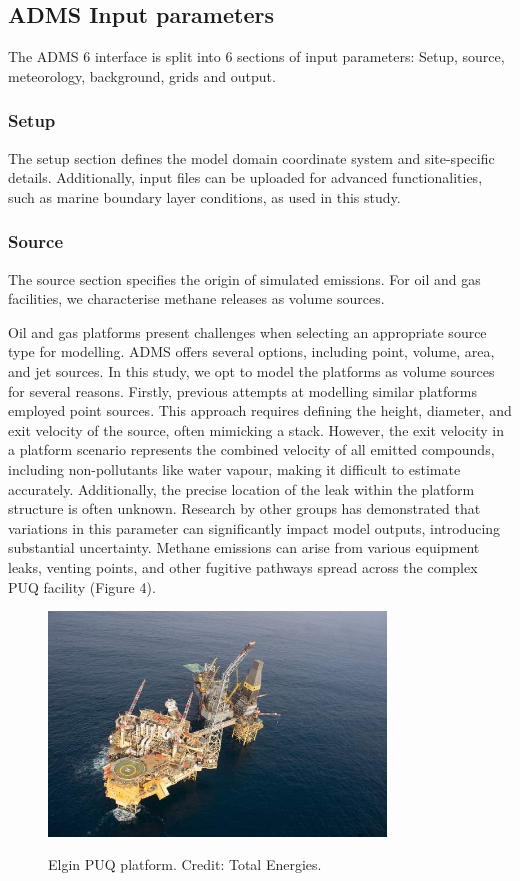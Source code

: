 \documentclass[12pt]{article}
\begin{document}
\subsection{ ADMS Input parameters}
The ADMS 6 interface is split into 6 sections of input parameters: Setup, source, meteorology, background, grids and output.  

\subsubsection{Setup}

The setup section defines the model domain coordinate system and site-specific details. Additionally, input files can be uploaded for advanced functionalities, such as marine boundary layer conditions, as used in this study.

\subsubsection{Source}

The source section specifies the origin of simulated emissions. For oil and gas facilities, we characterise methane releases as volume sources. 

Oil and gas platforms present challenges when selecting an appropriate source type for modelling. ADMS offers several options, including point, volume, area, and jet sources. In this study, we opt to model the platforms as volume sources for several reasons.
Firstly, previous attempts at modelling similar platforms employed point sources. This approach requires defining the height, diameter, and exit velocity of the source, often mimicking a stack. However, the exit velocity in a platform scenario represents the combined velocity of all emitted compounds, including non-pollutants like water vapour, making it difficult to estimate accurately. Additionally, the precise location of the leak within the platform structure is often unknown. Research by other groups has demonstrated that variations in this parameter can significantly impact model outputs, introducing substantial uncertainty.
Methane emissions can arise from various equipment leaks, venting points, and other fugitive pathways spread across the complex PUQ facility (Figure 4).

\begin{figure}[H]
\centering
\includegraphics[width=0.8\textwidth]{Plots/Elgin-3 Picture.jpg}
\caption{\label{fig:volume source}} Elgin PUQ platform. Credit: Total Energies. 
\end{figure}
\end{document}
